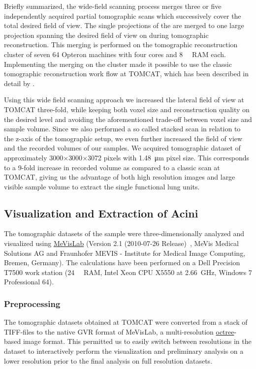 \documentclass[%
	paper=a4,%
	abstract=true,%
	]{scrartcl}
\begin{document}
Briefly summarized, the wide-field scanning process merges three or five independently acquired partial tomographic scans which successively cover the total desired field of view. The single projections of the are merged to one large projection spanning the desired field of view on during tomographic reconstruction. This merging is performed on the tomographic reconstruction cluster of seven \SI{64}{\bit} Opteron machines with four cores and \SI{8}{\giga\byte} RAM each. Implementing the merging on the cluster made it possible to use the classic tomographic reconstruction work flow at TOMCAT, which has been described in detail by \citet{Hintermueller2010}.

Using this wide field scanning approach we increased the lateral field of view at TOMCAT three-fold, while keeping both voxel size and reconstruction quality on the desired level and avoiding the aforementioned trade-off between voxel size and sample volume. Since we also performed a so called stacked scan in relation to the z-axis of the tomographic setup, we even further increased the field of view and the recorded volumes of our samples. We acquired tomographic dataset of approximately 3000\(\times\)3000\(\times\)3072 pixels with \SI{1.48}{\micro\meter} pixel size. This corresponds to a 9-fold increase in recorded volume as compared to a classic scan at TOMCAT, giving us the advantage of both high resolution images and large visible sample volume to extract the single functional lung units.

\subsection{Visualization and Extraction of Acini}
The tomographic datasets of the sample were three-dimensionally analyzed and visualized using \href{http://mevislab.de}{MeVisLab} (Version 2.1 (2010-07-26 Release)~\cite{Bitter2007}, MeVis Medical Solutions AG and Fraunhofer MEVIS - Institute for Medical Image Computing, Bremen, Germany). The calculations have been performed on a Dell Precision T7500 work station (\SI{24}{\giga\byte} RAM, Intel Xeon CPU X5550 at \SI{2.66}{\giga\hertz}, Windows 7 Professional \SI{64}{\bit}).

\subsubsection{Preprocessing}
The tomographic datasets obtained at TOMCAT were converted from a stack of TIFF-files to the native GVR format of MeVisLab, a multi-resolution \href{https://secure.wikimedia.org/wikipedia/en/w/index.php?title=Octree&oldid=409131920}{octree}-based image format. This permitted us to easily switch between resolutions in the dataset to interactively perform the visualization and preliminary analysis on a lower resolution prior to the final analysis on full resolution datasets.
\end{document}
